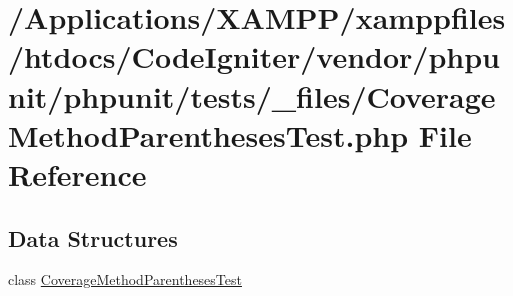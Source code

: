 \hypertarget{phpunit_2tests_2__files_2_coverage_method_parentheses_test_8php}{}\section{/\+Applications/\+X\+A\+M\+P\+P/xamppfiles/htdocs/\+Code\+Igniter/vendor/phpunit/phpunit/tests/\+\_\+files/\+Coverage\+Method\+Parentheses\+Test.php File Reference}
\label{phpunit_2tests_2__files_2_coverage_method_parentheses_test_8php}
\subsection*{Data Structures}
\begin{DoxyCompactItemize}
\item 
class \mbox{\hyperlink{class_coverage_method_parentheses_test}{Coverage\+Method\+Parentheses\+Test}}
\end{DoxyCompactItemize}
